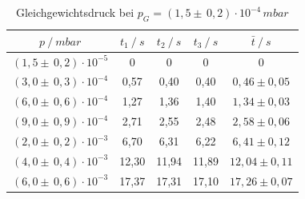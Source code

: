 \begin{table}[H]
\centering
\begin{tabular}{c|c|c|c|c}
	{$p \:/\: \si{mbar}$} & {$t_1 \:/\: \si{s} $} & {$t_2 \:/\: \si{s} $} & {$t_3 \:/\: \si{s} $} & {$\bar{t} \:/\: \si{s}$}\\
\midrule
$(1,5 \pm \, 0,2)\cdot 10^{-5}$ &0 &0 &0 &0\\
$(3,0 \pm \, 0,3)\cdot 10^{-4}$ &   0,57 &  0,40 &  0,40 & $0,46 \pm 0,05$\\
$(6,0 \pm \, 0,6)\cdot 10^{-4}$ &   1,27  &  1,36 &  1,40 & $1,34 \pm 0,03 $\\
$(9,0 \pm \, 0,9)\cdot 10^{-4}$ &   2,71 &  2,55 &  2,48 & $2,58 \pm 0,06 $\\
$(2,0 \pm \, 0,2)\cdot 10^{-3}$ &   6,70 &  6,31 &  6,22 & $6,41 \pm 0,12 $\\
$(4,0 \pm \, 0,4)\cdot 10^{-3}$ &   12,30 &  11,94 &  11,89 & $12,04 \pm 0,11 $\\
$(6,0 \pm \, 0,6)\cdot 10^{-3}$ &  17,37 & 17,31 & 17,10 & $17,26 \pm 0,07 $\\
\end{tabular}
\caption{Gleichgewichtsdruck bei $p_G=(1,5 \pm \, 0,2)\cdot 10^{-4} \, \si{mbar}$}
\label{tab:leck_Turbo3}
\end{table}

